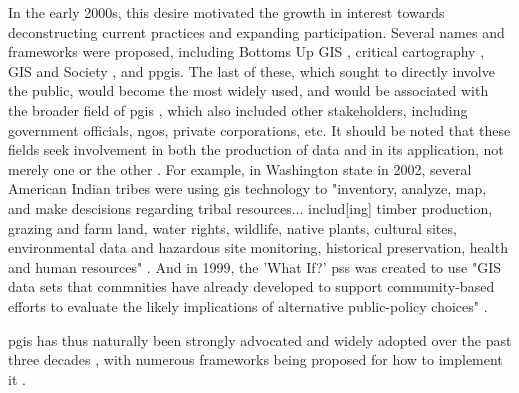 \documentclass[notitlepage]{article}
\begin{document}
In the early 2000s, this desire motivated the growth in interest towards deconstructing current practices and expanding participation. Several names and frameworks were proposed, including Bottoms Up GIS \cite{talenBottomUpGIS2000}, critical cartography \cite{cramptonIntroductionCriticalCartography2005, kimCriticalCartographyParticipatory2015}, GIS and Society \cite{sieberPublicParticipationGeographic2006}, and \ac{ppgis}. The last of these, which sought to directly involve the public, would become the most widely used, and would be associated with the broader field of \ac{pgis} \cite{sieberPublicParticipationGeographic2006}, which also included other stakeholders, including government officials, \acp{ngo}, private corporations, etc. It should be noted that these fields seek involvement in both the production of data and in its application, not merely one or the other \cite{weinerParticipatoryGeographicInformation2007, talenBottomUpGIS2000}. For example, in Washington state in 2002, several American Indian tribes were using \ac{gis} technology to "inventory, analyze, map, and make descisions regarding tribal resources... includ[ing] timber production, grazing and farm land, water rights, wildlife, native plants, cultural sites, environmental data and hazardous site monitoring, historical preservation, health and human resources" \cite{bondCherokeeNationTribal2002}. And in 1999, the 'What If?' \ac{pss} was created to use "GIS data sets that commnities have already developed to support community-based efforts to evaluate the likely implications of alternative public-policy choices" \cite{klostermanWhatIfCollaborative1999}. 


\ac{pgis} has thus naturally been strongly advocated and widely adopted over the past three decades \cite{drummondFutureGISPlanning2008}, with numerous frameworks being proposed for how to implement it \cite{brommelstroetPlanningSupportSystems2010}. 
\end{document}
